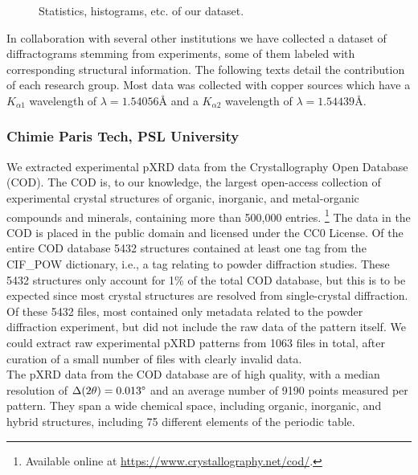 \begin{figure*}[!ht]
    \centering
    \missingfigure{} 
    \caption{Statistics, histograms, etc. of our dataset.}
    \label{fig:statistics}
\end{figure*}

In collaboration with several other institutions we have collected a dataset of diffractograms stemming from experiments, some of them labeled with corresponding structural information. The following texts detail the contribution of each research group. Most data was collected with copper sources which have a  $K_{\alpha1}$ wavelength of $\lambda=1.54056\text{\AA}$ and a $K_{\alpha2}$ wavelength of $\lambda=1.54439\text{\AA}$.

\subsubsection*{Chimie Paris Tech, PSL University}

We extracted experimental pXRD data from the Crystallography Open Database (COD).\cite{Grazulis2009, Vaitkus2023} The COD is, to our knowledge, the largest open-access collection of experimental crystal structures of organic, inorganic, and metal-organic compounds and minerals, containing more than 500,000 entries. \footnote{Available online at \url{https://www.crystallography.net/cod/}.} The data in the COD is placed in the public domain and licensed under the CC0 License. Of the entire COD database 5432 structures contained at least one tag from the {CIF\_POW} dictionary, i.e., a tag relating to powder diffraction studies. These 5432 structures only account for 1\% of the total COD database, but this is to be expected since most crystal structures are resolved from single-crystal diffraction. Of these 5432 files, most contained only metadata related to the powder diffraction experiment, but did not include the raw data of the pattern itself. We could extract raw experimental pXRD patterns from 1063 files in total, after curation of a small number of files with clearly invalid data. \\

The pXRD data from the COD database are of high quality, with a median resolution of $\Delta(2\theta) = 0.013\degree$ and an average number of 9190 points measured per pattern. They span a wide chemical space, including organic, inorganic, and hybrid structures, including 75 different elements of the periodic table.

